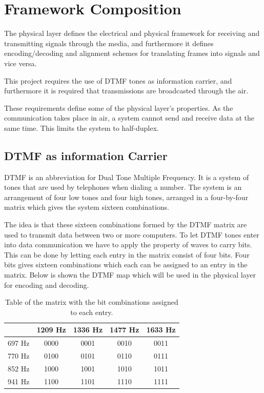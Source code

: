 \section{Framework Composition}\label{sec:physical_analysis} 
The physical layer defines the electrical and physical framework for receiving and 
transmitting signals through the media, and furthermore it defines encoding/decoding 
and alignment schemes for translating frames into signals and vice versa.

This project requires the use of DTMF tones as information carrier, and furthermore it is
required that transmissions are broadcasted through the air. 

These requirements define some of the physical layer's properties. As the communication takes place in air, a system cannot  send and receive data at the same time. This limits the system to half-duplex.


	\subsection{DTMF as information Carrier}
	DTMF is an abbreviation for Dual Tone Multiple Frequency. It is a system of tones that are used by
	telephones when dialing a number. The system is an arrangement of four low tones and four high tones,
	arranged in a four-by-four matrix which gives the system sixteen combinations.
	
	The idea is that these sixteen combinations formed by the DTMF matrix are used to transmit data
	between two or more computers. To let DTMF tones enter into data communication we have
	to apply the property of  waves to carry bits. This can be done by letting each entry in the matrix
	consist of four bits. Four bits gives sixteen combinations which each can be assigned to an entry in
	the matrix. Below is shown the DTMF map which will be used in the physical layer for encoding and decoding.
	
	\begin{table}[htb]
		\begin{center}
			\begin{tabular}{c|c c c c}
			 & 1209 Hz & 1336 Hz & 1477 Hz & 1633 Hz \\
			\hline
			697 Hz & 0000 & 0001 & 0010 & 0011 \\
			770 Hz & 0100 & 0101 & 0110 & 0111 \\
			852 Hz & 1000 & 1001 & 1010 & 1011 \\
			941 Hz & 1100 & 1101 & 1110 & 1111 \\
			\end{tabular}
		\end{center}
		\caption{Table of the matrix with the bit combinations assigned to each entry.}
		\label{tab:DTMF_mapping}
	\end{table}
	
